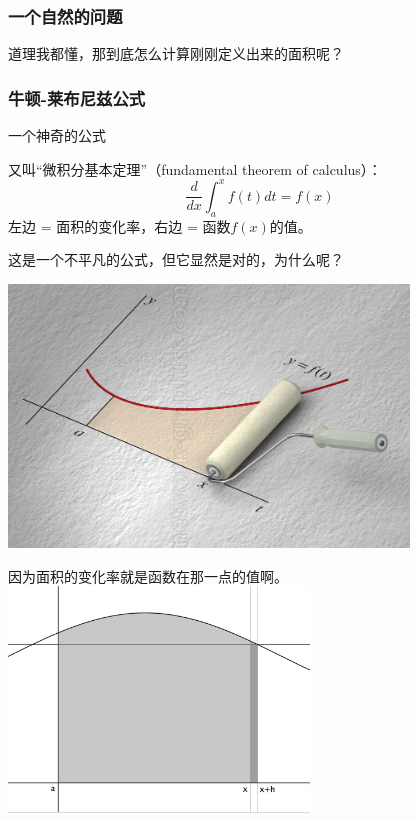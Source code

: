 \documentclass[CJK]{beamer}
\begin{document}
\begin{frame}
\begin{center}
\frametitle{一个自然的问题}
道理我都懂，那到底怎么\alert{计算}刚刚定义出来的面积呢？
\end{center}

\end{frame}

\begin{frame}
\frametitle{牛顿-莱布尼兹公式}
一个神奇的公式

又叫``微积分基本定理''（fundamental theorem of calculus）：
\[
	\dfrac{d}{dx}\int_a^x f(t)dt = f(x)
\]
左边 = 面积的变化率，右边 = 函数$f(x)$的值。

这是一个\alert{不平凡}的公式，但它\alert{显然}是对的，为什么呢？
\end{frame}

\begin{frame}
\begin{center}
\includegraphics[height=7cm]{paintroller_area_m.jpg}
\end{center}
\end{frame}

\begin{frame}
\begin{center}
因为面积的变化率就是函数在那一点的值啊。
\includegraphics[height=6cm]{graph3.jpg}
\end{center}
\end{frame}
\end{document}
